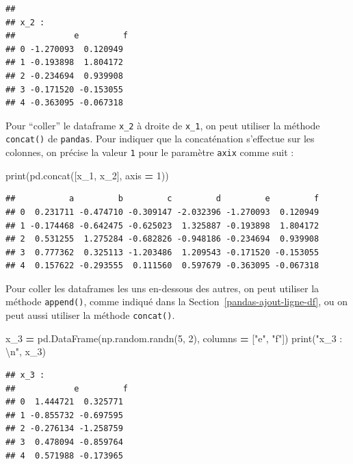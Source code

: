 \documentclass[12pt,]{book}
\newenvironment{Shaded}{\begin{snugshade}}{\end{snugshade}}
\newcommand{\DecValTok}[1]{\textcolor[rgb]{0.00,0.00,0.81}{#1}}
\newcommand{\CharTok}[1]{\textcolor[rgb]{0.31,0.60,0.02}{#1}}
\newcommand{\StringTok}[1]{\textcolor[rgb]{0.31,0.60,0.02}{#1}}
\newcommand{\OperatorTok}[1]{\textcolor[rgb]{0.81,0.36,0.00}{\textbf{#1}}}
\newcommand{\BuiltInTok}[1]{#1}
\newcommand{\NormalTok}[1]{#1}
\numberwithin{equation}{section}
\numberwithin{countremarque}{section}
\begin{document}
\begin{lstlisting}
## 
## x_2 : 
##            e         f
## 0 -1.270093  0.120949
## 1 -0.193898  1.804172
## 2 -0.234694  0.939908
## 3 -0.171520 -0.153055
## 4 -0.363095 -0.067318
\end{lstlisting}

Pour ``coller'' le dataframe \texttt{x\_2} à droite de \texttt{x\_1}, on
peut utiliser la méthode \texttt{concat()} de \texttt{pandas}. Pour
indiquer que la concaténation s'effectue sur les colonnes, on précise la
valeur \texttt{1} pour le paramètre \texttt{axix} comme suit :

\begin{Shaded}
\begin{Highlighting}[]
\BuiltInTok{print}\NormalTok{(pd.concat([x_1, x_2], axis }\OperatorTok{=} \DecValTok{1}\NormalTok{))}
\end{Highlighting}
\end{Shaded}

\begin{lstlisting}
##           a         b         c         d         e         f
## 0  0.231711 -0.474710 -0.309147 -2.032396 -1.270093  0.120949
## 1 -0.174468 -0.642475 -0.625023  1.325887 -0.193898  1.804172
## 2  0.531255  1.275284 -0.682826 -0.948186 -0.234694  0.939908
## 3  0.777362  0.325113 -1.203486  1.209543 -0.171520 -0.153055
## 4  0.157622 -0.293555  0.111560  0.597679 -0.363095 -0.067318
\end{lstlisting}

Pour coller les dataframes les uns en-dessous des autres, on peut
utiliser la méthode \texttt{append()}, comme indiqué dans la
Section~\ref{pandas-ajout-ligne-df}, ou on peut aussi utiliser la
méthode \texttt{concat()}.

\begin{Shaded}
\begin{Highlighting}[]
\NormalTok{x_3 }\OperatorTok{=}\NormalTok{ pd.DataFrame(np.random.randn(}\DecValTok{5}\NormalTok{, }\DecValTok{2}\NormalTok{),}
\NormalTok{                   columns }\OperatorTok{=}\NormalTok{ [}\StringTok{"e"}\NormalTok{, }\StringTok{"f"}\NormalTok{])}
\BuiltInTok{print}\NormalTok{(}\StringTok{"x_3 : }\CharTok{\textbackslash{}n}\StringTok{"}\NormalTok{, x_3)}
\end{Highlighting}
\end{Shaded}

\begin{lstlisting}
## x_3 : 
##            e         f
## 0  1.444721  0.325771
## 1 -0.855732 -0.697595
## 2 -0.276134 -1.258759
## 3  0.478094 -0.859764
## 4  0.571988 -0.173965
\end{lstlisting}
\end{document}
